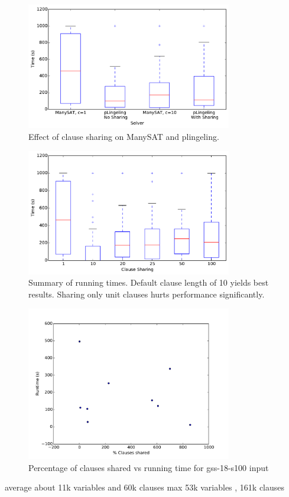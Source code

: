 \documentclass{article}
\begin{document}
\begin{figure}[h]
  \centering
  \includegraphics[width=0.8\textwidth]{../figs/cmp_box.pdf}
  \caption{Effect of clause sharing on ManySAT and plingeling.}
  \label{fig:cmp-1}
\end{figure}

\begin{figure}[h]
  \centering
    \includegraphics[width=0.8\textwidth]{../figs/boxplot_all.pdf}
  \caption{Summary of running times. Default clause length of 10 yields best results. Sharing only unit clauses hurts performance significantly.}
  \label{fig:boxplot-1}
\end{figure}



\begin{figure}[h]
  \centering
  \includegraphics[width=0.8\textwidth]{../figs/gss-18-s100.pdf}
  \caption{Percentage of clauses shared vs running time for gss-18-s100 input}
  \label{fig:gss}
\end{figure}

average about 11k variables and 60k clauses
max 53k variables , 161k clauses



\end{document}
